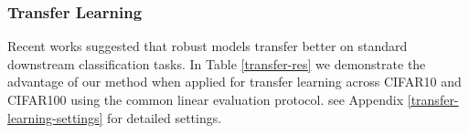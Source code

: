 


\subsubsection{Transfer Learning}
Recent works \citep{salman2020adversarially,utrera2020adversarially} suggested that robust models transfer better on standard downstream classification tasks. In Table \ref{transfer-res} we demonstrate the advantage of our method when applied for transfer learning across CIFAR10 and CIFAR100 using the common linear evaluation protocol. see Appendix \ref{transfer-learning-settings} for detailed settings.

